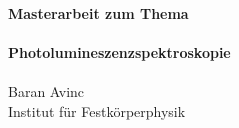
\begin{titlepage}
		\pagestyle{fancy}
		\centering\textbf{\large Masterarbeit zum Thema}\\
		\vspace{3cm} 
		\noindent{\color{RoyalPurple}\rule{\textwidth}{1pt}} \\
		\vspace{0.5cm} 
		\centering\textbf{\Huge Photolumineszenzspektroskopie} \\
		\vspace{0.25cm} 
		\noindent{\color{RoyalPurple}\rule{\textwidth}{1pt}} \\
		\vspace{3cm}
		\centering Baran Avinc \\
		\vspace{3cm}
		\centering Institut für Festkörperphysik
		\vspace{\fill} \\
\end{titlepage}

